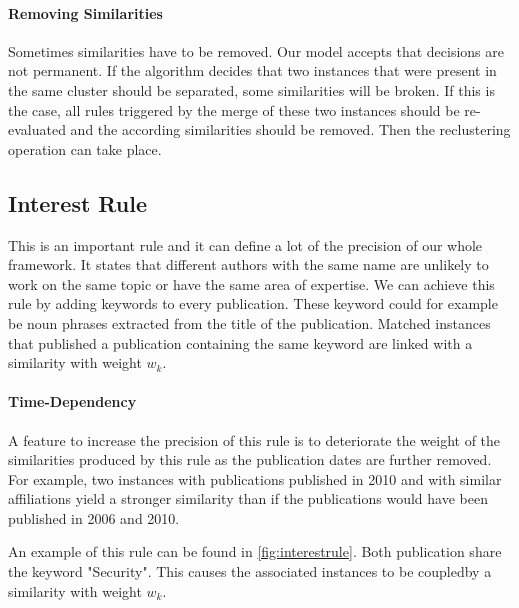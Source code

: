 \paragraph{Removing Similarities} Sometimes similarities have to be removed. Our model accepts that decisions are not permanent. If the algorithm decides that two instances that were present in the same cluster should be separated, some similarities will be broken. If this is the case, all rules triggered by the merge of these two instances should be re-evaluated and the according similarities should be removed. Then the reclustering operation can take place.

\subsection{Interest Rule}

This is an important rule and it can define a lot of the precision of our whole framework. It states that different authors with the same name are unlikely to work on the same topic or have the same area of expertise. We can achieve this rule by adding keywords to every publication. These keyword could for example be noun phrases extracted from the title of the publication. Matched instances that published a publication containing the same keyword are linked with a similarity with weight $w_k$.

\paragraph{Time-Dependency} A feature to increase the precision of this rule is to deteriorate the weight of the similarities produced by this rule as the publication dates are further removed. For example, two instances with publications published in 2010 and with similar affiliations yield a stronger similarity than if the publications would have been published in 2006 and 2010.

An example of this rule can be found in \autoref{fig:interestrule}. Both publication share the keyword "Security". This causes the associated instances to be coupledby a similarity with weight $w_k$.

